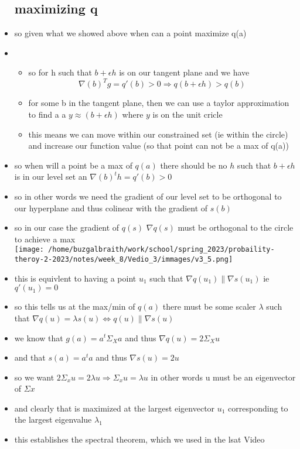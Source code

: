 \documentclass{article}
\begin{document}
\begin{itemize}
\subsection*{maximizing q }
\item so given what we showed above when can a point maximize q(a)
\item \begin{itemize}
\item so for h such that $b+\epsilon h$ is on our tangent plane and we have $$\nabla(b)^{T}g=q'(b)>0\Rightarrow q(b+\epsilon h)>q(b)$$
\item for some b in the tangent plane, then we can use a taylor approximation to find a a $y\approx (b+\epsilon h)$ where $y$ is on the unit cricle
\item this means we can move within our constrained set (ie within the circle) and increase our function value (so that point can not be a max of q(a))
\end{itemize}
\item so when will  a point be a max of $q(a)$ there should be no $h$ such that $b+\epsilon h$ is in our level set an $\nabla(b)^th=q'(b)> 0$
\item so in other words we need the gradient of our level set to be orthogonal to our hyperplane and thus colinear with the gradient of $s(b)$
\item so in our case the gradient of $q(s)$ $\nabla q(s)$ must be orthogonal to the circle to achieve a max \\ \texttt{[image: /home/buzgalbraith/work/school/spring\_2023/probaility-theroy-2-2023/notes/week\_8/Vedio\_3/immages/v3\_5.png]}
\item this is equivlent to having a point $u_1$ such that $\nabla q(u_1)\parallel \nabla s(u_1)$ ie $q'(u_1)=0$
\item so this tells us at the max/min of $q(a)$ there must be some scaler $\lambda$ such that $\nabla q(u)=\lambda s(u)\iff  q(u)\parallel \nabla s(u)$
\item we know that $g(a)=a^t\Sigma_{X}a$ and thus $\nabla q(u)=2\Sigma_{X} u$
\item and that $s(a)=a^ta$ and thus $\nabla s(u)=2u$ 
\item so we want  $2\Sigma_{x}u=2\lambda u\Rightarrow \Sigma_{x}u=\lambda u$ in other words u must be an eigenvector of $\Sigma x$ 
\item and clearly that is maximized at the largest eigenvector $u_1$ corresponding to the largest eigenvalue $\lambda_1$
\item this establishes the spectral theorem, which we used in the lsat Video
\end{itemize}
\end{document}
